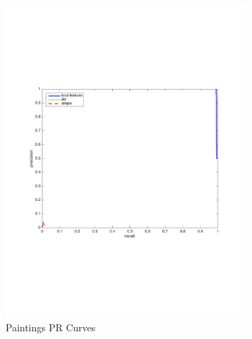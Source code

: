\documentclass[english,12pt,a4paper,pdftex,elec,utf8, table]{aaltothesis}
\begin{document}
\begin{figure}[htb]
\begin{center}
\begin{subfigure}[b]{0.49\textwidth}
    \includegraphics[width=\textwidth]{figures/Rotate10PR.pdf}
    \caption{Paintings PR Curves}
    \label{Rotaterocthinglink}
  \end{subfigure}
  \begin{subfigure}[b]{0.49\textwidth}

\end{subfigure}
\end{center}
\end{figure}
\end{document}
